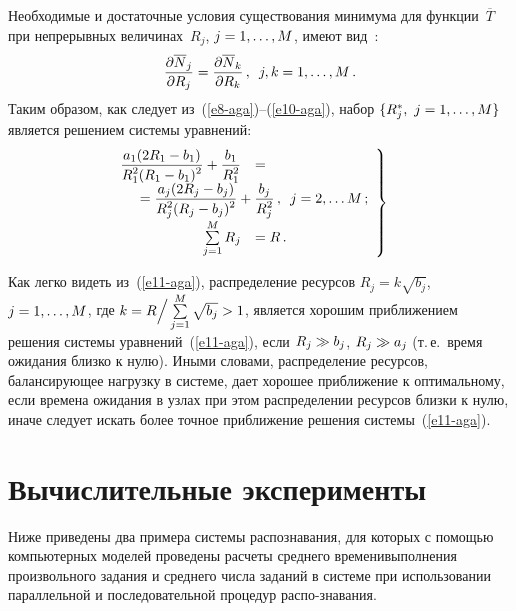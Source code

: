 \begin{multicols}{2}
Необходимые и достаточные условия существования минимума для
функции~$\overline{T}$ при непрерывных величинах~$R_j$, $j\hm= 1,\ldots ,
M$, имеют вид~\cite{12-aga}:
\begin{equation}
\displaystyle\frac{\displaystyle \partial \overline{N}_j\mathstrut}{\displaystyle \partial R_j\mathstrut}= \displaystyle\frac{\displaystyle \partial \overline{N}_k \mathstrut}{\displaystyle \partial
R_k\mathstrut}\,,\enskip j,k=1,\ldots , M\,.
\label{e10-aga}
\end{equation}
Таким образом, как следует из~(\ref{e8-aga})--(\ref{e10-aga}), набор $\{R_j^*,\
j\hm= 1,\ldots ,M\}$ является решением системы уравнений:
\begin{equation}
\left.
\begin{array}{rl}
\hspace*{-5mm}\fr{a_1(2R_1-b_1)}{R^2_1(R_1-b_1)^2}+\fr{b_1}{R_1^2} &=\\
&\hspace*{-30mm}{}= \fr{a_j(2R_j-b_j)}
{R^2_j(R_j-b_j)^2} + \fr{b_j}{R_j^2}\,,\enskip j=2,\ldots M\,;\\[9pt]
\sum\limits_{j=1}^M R_j&=R\,.
\end{array}
\right\}
\label{e11-aga}
\end{equation}

Как легко видеть из~(\ref{e11-aga}), распределение ресурсов $R_j=k\sqrt{b_j}$,
$j\hm= 1,\ldots , M$, где $k= R\Big /\sum\limits^M_{j=1}\sqrt{b_j} \hm >1$, является
хорошим приближением решения сис\-те\-мы уравнений~(\ref{e11-aga}), если
$R_j\hm\gg b_j$, $R_j\hm\gg a_j$ (т.\,е.\ время ожидания близко к нулю). Иными
словами, распределение ресурсов, балансирующее нагрузку в системе, дает
хорошее приближение к оптимальному, если времена ожидания в узлах при
этом распределении ресурсов близки к нулю, иначе следует искать более
точное приближение решения сис\-темы~(\ref{e11-aga}).

\vspace*{-6pt}

\section{Вычислительные эксперименты}

\vspace*{-2pt}

Ниже приведены два примера системы распознавания, для которых с помощью
компьютерных моделей проведены расчеты среднего времени\linebreak выполнения
произвольного задания и среднего чис\-ла заданий в системе при использовании
параллельной и последовательной процедур распо-\linebreak знавания.
{ %

}
\end{multicols}
